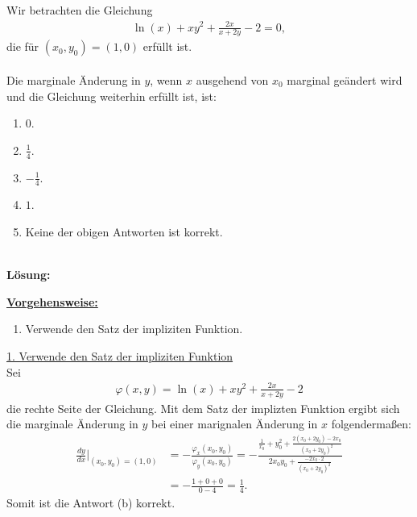 \newpage

\subsection*{}
Wir betrachten die Gleichung
\begin{align*}
	\ln(x) + x y^2 + \frac{2x}{x + 2y} - 2 = 0,
\end{align*}
die für $(x_0,y_0) = (1,0)$ erfüllt ist.\\
\\
Die marginale Änderung in $y$, wenn $x$ ausgehend von $x_0$ marginal geändert wird und die Gleichung weiterhin erfüllt ist, ist:
\renewcommand{\labelenumi}{(\alph{enumi})}
\begin{enumerate}
	\item 
	$ 0 $.
	\item
	$ \frac{1}{4}$.
	\item
	$ -\frac{1}{4}$.
	\item
	$ 1$.
	\item
	Keine der obigen Antworten ist korrekt.
\end{enumerate}
\ \\
\textbf{Lösung:}
\begin{mdframed}
\underline{\textbf{Vorgehensweise:}}
\renewcommand{\labelenumi}{\theenumi.}
\begin{enumerate}
\item Verwende den Satz der impliziten Funktion.
\end{enumerate}
\end{mdframed}

\underline{1. Verwende den Satz der impliziten Funktion}\\
Sei 
\begin{align*}
	\varphi(x,y) 
	=
	\ln(x) + xy^2
	+
	\frac{2x}{x+2y}
	-
	2
\end{align*}
die rechte Seite der Gleichung.
Mit dem Satz der implizten Funktion ergibt sich die marginale Änderung in $y$ bei einer marignalen Änderung in $x$ folgendermaßen:
\begin{align*}
	\frac{dy}{dx} \bigg|_{(x_0,y_0) = (1,0)}
	&=
	- 
	\frac{\varphi_x(x_0,y_0)}{\varphi_y(x_0,y_0)}
	=
	-
	\frac{\frac{1}{x_0} + y_0^2 + \frac{2(x_0 + 2 y_0) - 2x_0}{(x_0 + 2y_0)^2}}{2 x_0 y_0 + \frac{-2 x_0 \cdot 2}{(x_0 + 2y_0)^2}}\\
	&=
	- 
	\frac{1 + 0 + 0}{0-4}
	= \frac{1}{4}.
\end{align*}
Somit ist die Antwort (b) korrekt.


\newpage

